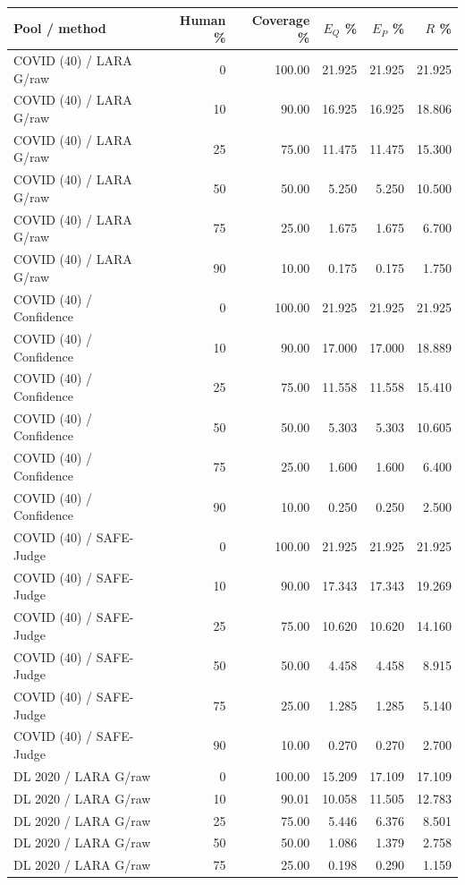 \begin{longtable}{@{}lrrrrr@{}}
\toprule
Pool / method & Human \% & Coverage \% & $E_Q$ \% & $E_P$ \% & $R$ \% \\
\midrule
\endhead
COVID (40) / LARA G/raw & 0 & 100.00 & 21.925 & 21.925 & 21.925 \\
COVID (40) / LARA G/raw & 10 & 90.00 & 16.925 & 16.925 & 18.806 \\
COVID (40) / LARA G/raw & 25 & 75.00 & 11.475 & 11.475 & 15.300 \\
COVID (40) / LARA G/raw & 50 & 50.00 & 5.250 & 5.250 & 10.500 \\
COVID (40) / LARA G/raw & 75 & 25.00 & 1.675 & 1.675 & 6.700 \\
COVID (40) / LARA G/raw & 90 & 10.00 & 0.175 & 0.175 & 1.750 \\
COVID (40) / Confidence & 0 & 100.00 & 21.925 & 21.925 & 21.925 \\
COVID (40) / Confidence & 10 & 90.00 & 17.000 & 17.000 & 18.889 \\
COVID (40) / Confidence & 25 & 75.00 & 11.558 & 11.558 & 15.410 \\
COVID (40) / Confidence & 50 & 50.00 & 5.303 & 5.303 & 10.605 \\
COVID (40) / Confidence & 75 & 25.00 & 1.600 & 1.600 & 6.400 \\
COVID (40) / Confidence & 90 & 10.00 & 0.250 & 0.250 & 2.500 \\
COVID (40) / SAFE-Judge & 0 & 100.00 & 21.925 & 21.925 & 21.925 \\
COVID (40) / SAFE-Judge & 10 & 90.00 & 17.343 & 17.343 & 19.269 \\
COVID (40) / SAFE-Judge & 25 & 75.00 & 10.620 & 10.620 & 14.160 \\
COVID (40) / SAFE-Judge & 50 & 50.00 & 4.458 & 4.458 & 8.915 \\
COVID (40) / SAFE-Judge & 75 & 25.00 & 1.285 & 1.285 & 5.140 \\
COVID (40) / SAFE-Judge & 90 & 10.00 & 0.270 & 0.270 & 2.700 \\
DL 2020 / LARA G/raw & 0 & 100.00 & 15.209 & 17.109 & 17.109 \\
DL 2020 / LARA G/raw & 10 & 90.01 & 10.058 & 11.505 & 12.783 \\
DL 2020 / LARA G/raw & 25 & 75.00 & 5.446 & 6.376 & 8.501 \\
DL 2020 / LARA G/raw & 50 & 50.00 & 1.086 & 1.379 & 2.758 \\
DL 2020 / LARA G/raw & 75 & 25.00 & 0.198 & 0.290 & 1.159 \\

\end{longtable}

